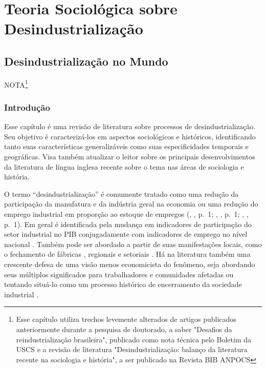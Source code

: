 \section{Teoria Sociológica sobre Desindustrialização}\label{teoria-socioluxf3gica-sobre-desindustrializauxe7uxe3o}

\subsection{Desindustrialização no Mundo}\label{desindustrializauxe7uxe3o-no-mundo}
NOTA\footnote{Esse capítulo utiliza trechos levemente alterados de artigos publicados 
anteriormente durante a pesquisa de doutorado, a saber "Desafios da reindustrialização brasileira",
publicado como nota técnica pelo Boletim da USCS e a revisão de literatura "Desindustrialização: 
balanço da literatura recente na sociologia e história", a ser publicado na Revista BIB ANPOCS}
\subsubsection{Introdução}

Esse capítulo é uma revisão de literatura sobre processos de
desindustrialização. Seu objetivo é caracterizá-los em aspectos
sociológicos e históricos, identificando tanto suas características
generalizáveis como suas especificidades temporais e geográficas. Visa
também atualizar o leitor sobre os principais desenvolvimentos da
literatura de língua inglesa recente sobre o tema nas áreas de
sociologia e história.

O termo ``desindustrialização'' é comumente tratado como uma redução da
participação da manufatura e da indústria geral na economia
\citep[p.~1]{pula_industrialization_2017} ou
uma redução do emprego industrial em proporção ao estoque de empregos
(\citeauthor{dandaneau_deindustrialization_2012}, \citeyear{dandaneau_deindustrialization_2012}, p.~1; \citeauthor{kollmeyer_deindustrialization_2020}, \citeyear{kollmeyer_deindustrialization_2020}, p.~1; \citeauthor{orum_deindustrialization_2019}, \citeyear{orum_deindustrialization_2019}, p.~1). Em geral é
identificada pela mudança em indicadores de participação do setor
industrial no PIB
\citep{rowthorn_growth_1999} conjugadamente com indicadores de emprego no nível nacional
\citep{tregenna_characterising_2009}.
Também pode ser abordado a partir de suas manifestações locais, como o
fechamento de fábricas
\citep{clarke_closing_2015,hodson_titanic_2019}, regionais e setoriais
\citep{berger_burdens_2017,durazzi_social_2020}. Há na literatura também uma
crescente defesa de uma visão menos economicista do fenômeno, seja
abordando seus múltiplos significados para trabalhadores e comunidades
afetadas \citep{cowie_beyond_2003} ou tentando situá-lo como um processo histórico de
encerramento da sociedade industrial
\citep{strangleman_deindustrialisation_2017}.

